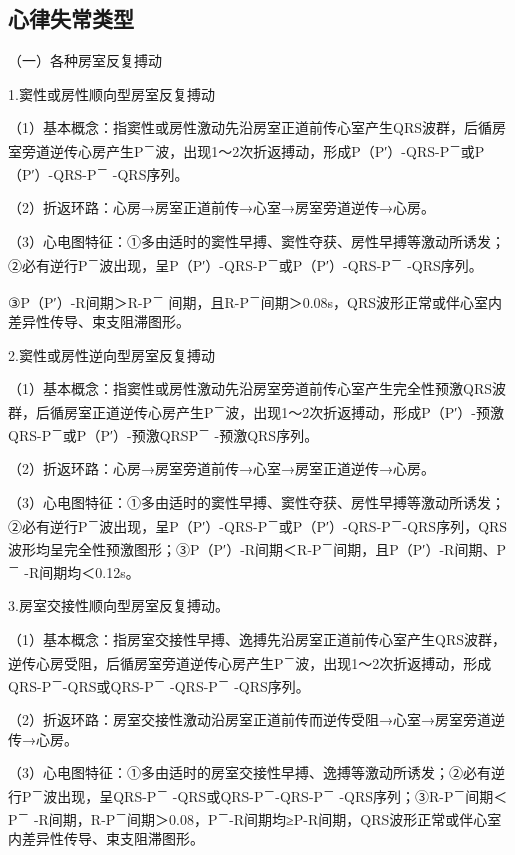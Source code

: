 \subsection{心律失常类型}

（一）各种房室反复搏动

1.窦性或房性顺向型房室反复搏动

（1）基本概念：指窦性或房性激动先沿房室正道前传心室产生QRS波群，后循房室旁道逆传心房产生P\textsuperscript{－}波，出现1～2次折返搏动，形成P（P′）-QRS-P\textsuperscript{－}或P（P′）-QRS-P\textsuperscript{－} -QRS序列。

（2）折返环路：心房→房室正道前传→心室→房室旁道逆传→心房。

（3）心电图特征：①多由适时的窦性早搏、窦性夺获、房性早搏等激动所诱发；②必有逆行P\textsuperscript{－}波出现，呈P（P′）-QRS-P\textsuperscript{－}或P（P′）-QRS-P\textsuperscript{－} -QRS序列。

③P（P′）-R间期＞R-P\textsuperscript{－} 间期，且R-P\textsuperscript{－}间期＞0.08s，QRS波形正常或伴心室内差异性传导、束支阻滞图形。

2.窦性或房性逆向型房室反复搏动

（1）基本概念：指窦性或房性激动先沿房室旁道前传心室产生完全性预激QRS波群，后循房室正道逆传心房产生P\textsuperscript{－}波，出现1～2次折返搏动，形成P（P′）-预激QRS-P\textsuperscript{－}或P（P′）-预激QRSP\textsuperscript{－} -预激QRS序列。

（2）折返环路：心房→房室旁道前传→心室→房室正道逆传→心房。

（3）心电图特征：①多由适时的窦性早搏、窦性夺获、房性早搏等激动所诱发；②必有逆行P\textsuperscript{－}波出现，呈P（P′）-QRS-P\textsuperscript{－}或P（P′）-QRS-P\textsuperscript{－}-QRS序列，QRS波形均呈完全性预激图形；③P（P′）-R间期＜R-P\textsuperscript{－}间期，且P（P′）-R间期、P\textsuperscript{－} -R间期均＜0.12s。

3.房室交接性顺向型房室反复搏动。

（1）基本概念：指房室交接性早搏、逸搏先沿房室正道前传心室产生QRS波群，逆传心房受阻，后循房室旁道逆传心房产生P\textsuperscript{－}波，出现1～2次折返搏动，形成QRS-P\textsuperscript{－}-QRS或QRS-P\textsuperscript{－} -QRS-P\textsuperscript{－} -QRS序列。

（2）折返环路：房室交接性激动沿房室正道前传而逆传受阻→心室→房室旁道逆传→心房。

（3）心电图特征：①多由适时的房室交接性早搏、逸搏等激动所诱发；②必有逆行P\textsuperscript{－}波出现，呈QRS-P\textsuperscript{－} -QRS或QRS-P\textsuperscript{－}-QRS-P\textsuperscript{－} -QRS序列；③R-P\textsuperscript{－}间期＜P\textsuperscript{－} -R间期，R-P\textsuperscript{－}间期＞0.08，P\textsuperscript{－}-R间期均≥P-R间期，QRS波形正常或伴心室内差异性传导、束支阻滞图形。

